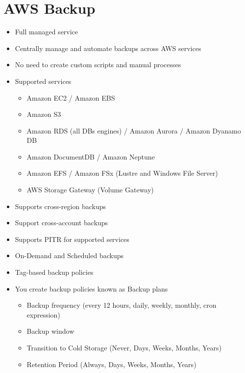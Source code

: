 {{\section{AWS Backup}
\begin{itemize}
    \item Full managed service
    \item Centrally manage and automate backups across AWS services
    \item No need to create custom scripts and manual processes
    \item Supported services
    \begin{itemize}
        \item Amazon EC2 / Amazon EBS
        \item Amazon S3
        \item Amazon RDS (all DBs engines) / Amazon Aurora / Amazon Dyanamo DB
        \item Amazon DocumentDB / Amazon Neptune
        \item Amazon EFS / Amazon FSx (Lustre and Windows File Server)
        \item AWS Storage Gateway (Volume Gateway)
    \end{itemize}
    \item Supports cross-region backups
    \item Support cross-account backups
    \item Supports PITR for supported services
    \item On-Demand and Scheduled backups
    \item Tag-based backup policies
    \item You create backup policies known as Backup plans
    \begin{itemize}
        \item Backup frequency (every 12 hours, daily, weekly, monthly, cron expression)
        \item Backup window
        \item Transition to Cold Storage (Never, Days, Weeks, Months, Years)
        \item Retention Period (Always, Days, Weeks, Months, Years)
    \end{itemize}
\end{itemize}


}}
